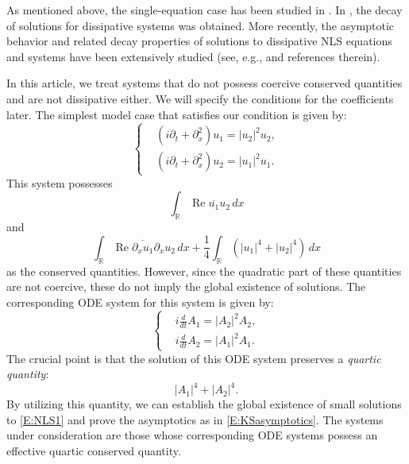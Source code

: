 \documentclass[11pt,a4paper,oneside]{amsart}
\theoremstyle{plain}
\theoremstyle{remark}
\numberwithin{equation}{section}
\renewcommand{\Re}{\operatorname{Re}}
\theoremstyle{definition}
\begin{document}
As mentioned above, the single-equation case has been studied in \cite{HNS,Shimomura}.
In \cite{LS,LS2,SaSu}, the decay of solutions for dissipative systems was obtained.
More recently, the asymptotic behavior and related decay properties of solutions to dissipative NLS equations and systems have been extensively studied (see, e.g., \cite{LNSS1,LNSS2,LNSS5,KiSa,KiSa2,Sa} and references therein).



In this article, we treat systems that do not possess coercive conserved quantities and are not dissipative either. We will specify the conditions for the coefficients later. The simplest model case that satisfies our condition is given by:
\begin{equation}\label{E:NLS1}
	\left\{
	\begin{aligned}
	& (i  \partial_t + \partial_x^2 )u_1 =  |u_2|^2 u_2,  \\
	& (i  \partial_t + \partial_x^2 )u_2 =  |u_1|^2 u_1 .
	\end{aligned}
	\right.
\end{equation}
This system possesses 
\[
	\int_\mathbb{R} \Re \overline{u_1} u_2 \, dx
\]
and
\[
	\int_\mathbb{R} \Re \overline{\partial_x u_1} \partial_x u_2 \, dx + \frac14 \int_\mathbb{R} 
	(|u_1|^4 + |u_2|^4) \, dx
\]
as the conserved quantities.
However, since the quadratic part of these quantities are not coercive, these do not imply the global existence of solutions. 
The corresponding ODE system for this system is given by:
\begin{equation}\label{E:ODE1}
	\left\{
	\begin{aligned}
	&i \tfrac{d}{dt} A_1  = |A_2|^2 A_2,\\
	&i \tfrac{d}{dt} A_2  = |A_1|^2 A_1.
	\end{aligned}
	\right.
\end{equation}
The crucial point is that the solution of this ODE system preserves a \emph{quartic quantity}:
\[
	|A_1|^4 + |A_2|^4.
\]
By utilizing this quantity, we can establish the global existence of small solutions to \eqref{E:NLS1} and prove the asymptotics as in \eqref{E:KSasymptotics}. The systems under consideration are those whose corresponding ODE systems possess an effective quartic conserved quantity. 
\end{document}
